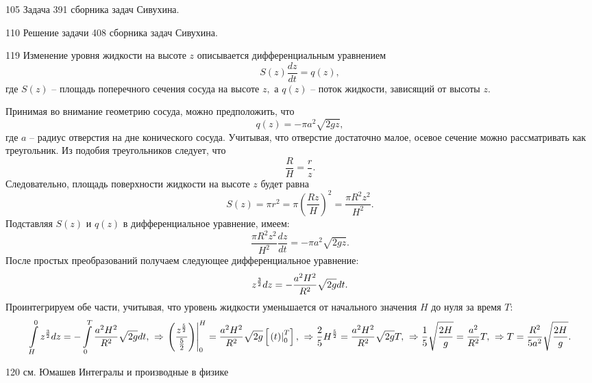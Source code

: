 \begin{Solution}{105}
Задача 391 сборника задач Сивухина.
\end{Solution}
\begin{Solution}{110}
Решение задачи 408 сборника задач Сивухина.
\end{Solution}
\begin{Solution}{119}
Изменение уровня жидкости на высоте \(z\) описывается дифференциальным уравнением
\[S\left( z \right)\frac{{dz}}{{dt}} = q\left( z \right),\]
где \(S\left( z \right)\) -- площадь поперечного сечения сосуда на высоте \(z,\) а \(q\left( z \right)\) -- поток жидкости, зависящий от высоты $z$.

Принимая во внимание геометрию сосуда, можно предположить, что \[q\left( z \right) =  - \pi {a^2}\sqrt {2gz} ,\] где \(a\) -- радиус отверстия на дне конического сосуда. Учитывая, что отверстие достаточно малое, осевое сечение можно рассматривать как треугольник. Из подобия треугольников следует, что \[\frac{R}{H} = \frac{r}{z}.\] Следовательно, площадь поверхности жидкости на высоте \(z\) будет равна
\[
{S\left( z \right) = \pi {r^2} }
= {\pi {\left( {\frac{{Rz}}{H}} \right)^2} }
= {\frac{{\pi {R^2}{z^2}}}{{{H^2}}}.}
\]
Подставляя \(S\left( z \right)\) и \(q\left( z \right)\) в дифференциальное уравнение, имеем:
\[\frac{{\pi {R^2}{z^2}}}{{{H^2}}}\frac{{dz}}{{dt}} =  - \pi {a^2}\sqrt {2gz} .\]
После простых преобразований получаем следующее дифференциальное уравнение:
\[{z^{\large\frac{3}{2}\normalsize}}dz =  - \frac{{{a^2}{H^2}}}{{{R^2}}}\sqrt {2g} dt.\]
Проинтегрируем обе части, учитывая, что уровень жидкости уменьшается от начального значения \(H\) до нуля за время \(T:\)
\[
{\int\limits_H^0 {{z^{\large\frac{3}{2}\normalsize}}dz}  =  - \int\limits_0^T {\frac{{{a^2}{H^2}}}{{{R^2}}}\sqrt {2g} dt} ,}\;\;
{\Rightarrow \left. {\left( {\frac{{{z^{\large\frac{5}{2}\normalsize}}}}{{\frac{5}{2}}}} \right)} \right|_0^H = \frac{{{a^2}{H^2}}}{{{R^2}}}\sqrt {2g} \left[ {\left. {\left( t \right)} \right|_0^T} \right],}\;\;
{\Rightarrow \frac{2}{5}{H^{\large\frac{5}{2}\normalsize}} = \frac{{{a^2}{H^2}}}{{{R^2}}}\sqrt {2g} T,}\;\;
{\Rightarrow \frac{1}{5}\sqrt {\frac{{2H}}{g}}  = \frac{{{a^2}}}{{{R^2}}}T,}\;\;
{\Rightarrow T = \frac{{{R^2}}}{{5{a^2}}}\sqrt {\frac{{2H}}{g}} .}
\]
\end{Solution}
\begin{Solution}{120}
см. Юмашев Интегралы и производные в физике
\end{Solution}
